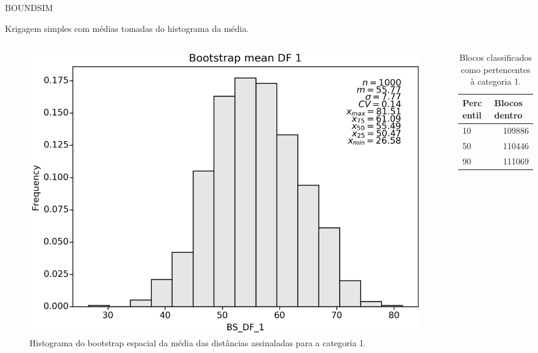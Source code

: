 \documentclass[aspectratio=169]{beamer}
\begin{document}
\begin{frame}{BOUNDSIM}

Krigagem simples com médias tomadas do histograma da média.

\begin{columns}
	\begin{column}{0.5\textwidth}
	\begin{figure}[H]
		\caption{\label{bs_df_1}Histograma do bootstrap espacial da média das distâncias assinaladas para a categoria 1.}
		\begin{center}
			\includegraphics[width=\textwidth]{capitulo_2/BS_DF_1.png}
		\end{center}
	\end{figure}
	\end{column}
	\begin{column}{0.5\textwidth}  %
	\begin{table}[H]
					\centering
			\begin{tabular}{lr}
				Percentil & \multicolumn{1}{l}{Blocos dentro} \\ \hline
				10 & 109886 \\
				50 & 110446 \\
				90 & 111069 \\ \hline
			\end{tabular}
		\caption{Blocos classificados como pertencentes à categoria 1.}\label{boundsim_table}
	\end{table}
	\end{column}
\end{columns}

\end{frame}
\end{document}
